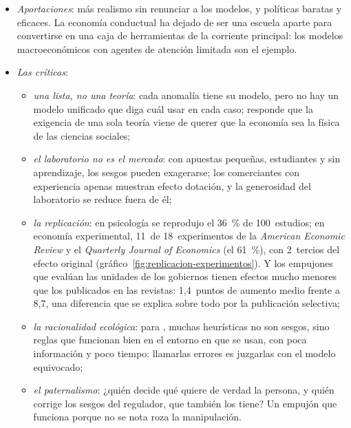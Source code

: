 \documentclass[11pt]{article}
\begin{document}
\begin{itemize}
\item \emph{Aportaciones}: más realismo sin renunciar a los modelos, y políticas baratas y eficaces. La economía conductual ha dejado de ser una escuela aparte para convertirse en una caja de herramientas de la corriente principal: los modelos macroeconómicos con agentes de atención limitada\nocite{Gabaix2020Behavioral} son el ejemplo.
\item \emph{Las críticas}:
  \begin{itemize}
  \item \emph{una lista, no una teoría}: cada anomalía tiene su modelo, pero no hay un modelo unificado que diga cuál usar en cada caso\nocite{Fudenberg2006Advancing};  responde que la exigencia de una sola teoría viene de querer que la economía sea la física de las ciencias sociales\nocite{Thaler2015Misbehaving};
  \item \emph{el laboratorio no es el mercado}: con apuestas pequeñas, estudiantes y sin aprendizaje, los sesgos pueden exagerarse; los comerciantes con experiencia apenas muestran efecto dotación\nocite{List2003Market}, y la generosidad del laboratorio se reduce fuera de él\nocite{LevittList2007Laboratory};
  \item \emph{la replicación}: en psicología se reprodujo el 36~\% de 100~estudios\nocite{OSC2015Reproducibility}; en economía experimental, 11~de 18~experimentos de la \emph{American Economic Review} y el \emph{Quarterly Journal of Economics} (el 61~\%), con 2~tercios del efecto original\nocite{Camerer2016Replicability} (gráfico~\ref{fig:replicacion-experimentos}). Y los empujones que evalúan las unidades de los gobiernos tienen efectos mucho menores que los publicados en las revistas: 1,4~puntos de aumento medio frente a 8,7, una diferencia que se explica sobre todo por la publicación selectiva\nocite{DellaVignaLinos2022RCTs};
  \item \emph{la racionalidad ecológica}: para  \parencite*{Gigerenzer2018Bias}, muchas heurísticas no son sesgos, sino reglas que funcionan bien en el entorno en que se usan, con poca información y poco tiempo\nocite{GigerenzerGoldstein1996Reasoning}: llamarlas errores es juzgarlas con el modelo equivocado;
  \item \emph{el paternalismo}: ¿quién decide qué quiere de verdad la persona, y quién corrige los sesgos del regulador, que también los tiene? Un empujón que funciona porque no se nota roza la manipulación.
  \end{itemize}
\end{itemize}
\end{document}
